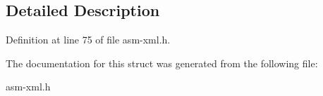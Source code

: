 \subsection{Detailed Description}


Definition at line 75 of file asm-\/xml.\-h.



The documentation for this struct was generated from the following file\-:\begin{DoxyCompactItemize}
\item 
asm-\/xml.\-h\end{DoxyCompactItemize}

